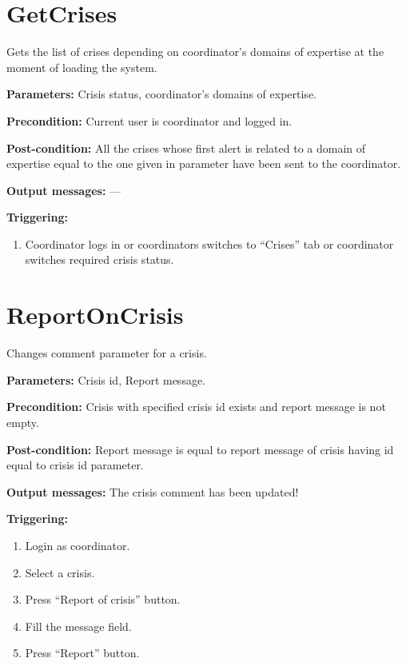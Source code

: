 \section{GetCrises}
\label{operation:GetCrises}
Gets the list of crises depending on coordinator’s domains of expertise at the
moment of loading the system.

\begin{description}

\item \textbf{Parameters:} Crisis status, coordinator’s domains of
expertise.
\item \textbf{Precondition:} Current user is coordinator and logged
in.
\item \textbf{Post-condition:} All the crises whose first alert is related to a
domain of expertise equal to the one given in parameter have been sent to the
coordinator.

\item \textbf{Output messages:} ---

\item \textbf{Triggering:}
\begin{enumerate}
\item Coordinator logs in or coordinators switches to ``Crises'' tab or
coordinator switches required crisis status.
\end{enumerate}
 
\end{description}

\section{ReportOnCrisis}
\label{operation:ReportOnCrisis}
Changes comment parameter for a crisis.

\begin{description}

\item \textbf{Parameters:} Crisis id, Report message.
\item \textbf{Precondition:} Crisis with specified crisis id exists and report
message is not empty.
\item \textbf{Post-condition:} Report message is equal to report message of
crisis having id equal to crisis id parameter.

\item \textbf{Output messages:} The crisis comment has been updated!

\item \textbf{Triggering:}
\begin{enumerate}
\item Login as coordinator.
\item Select a crisis.
\item Press ``Report of crisis'' button.
\item Fill the message field.
\item Press ``Report'' button.
\end{enumerate}
 
\end{description}

